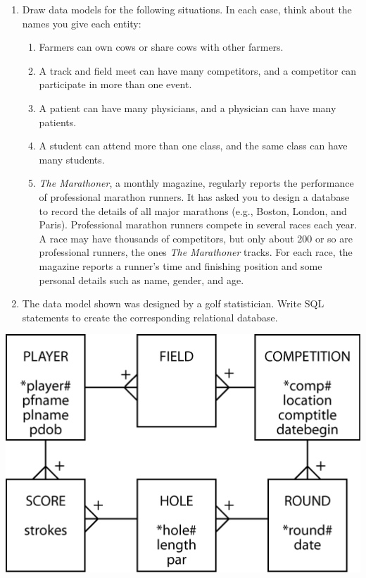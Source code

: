 \documentclass[
]{article}
\begin{document}
\begin{enumerate}
\def\labelenumi{\arabic{enumi}.}
\item
  Draw data models for the following situations. In each case, think about the names you give each entity:

  \begin{enumerate}
  \def\labelenumii{\alph{enumii}.}
  \item
    Farmers can own cows or share cows with other farmers.
  \item
    A track and field meet can have many competitors, and a competitor can participate in more than one event.
  \item
    A patient can have many physicians, and a physician can have many patients.
  \item
    A student can attend more than one class, and the same class can have many students.
  \item
    \emph{The Marathoner}, a monthly magazine, regularly reports the performance of professional marathon runners. It has asked you to design a database to record the details of all major marathons (e.g., Boston, London, and Paris). Professional marathon runners compete in several races each year. A race may have thousands of competitors, but only about 200 or so are professional runners, the ones \emph{The Marathoner} tracks. For each race, the magazine reports a runner's time and finishing position and some personal details such as name, gender, and age.
  \end{enumerate}
\item
  The data model shown was designed by a golf statistician. Write SQL statements to create the corresponding relational database.
\end{enumerate}

\includegraphics[width=5.44792in,height=\textheight]{Figures/Chapter 5/golf.png}
\end{document}
